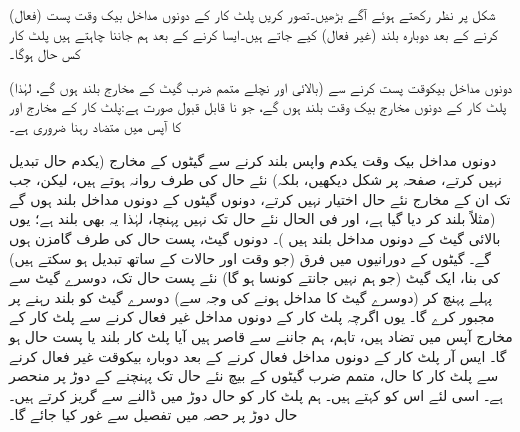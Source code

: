 شکل  پر نظر رکھتے ہوئے  آگے بڑھیں۔تصور کریں  پلٹ کار کے دونوں مداخل بیک وقت     پست (فعال)   کرنے کے بعد دوبارہ  بلند (غیر فعال) کیے جاتے ہیں۔ایسا کرنے کے بعد ہم جاننا چاہتے ہیں  پلٹ کار کس حال  ہوگا۔

دونوں مداخل بیکوقت  پست کرنے سے (بالائی اور نچلے متمم ضرب گیٹ کے  مخارج بلند ہوں گے، لہٰذا)  پلٹ کار کے دونوں مخارج بیک وقت بلند ہوں گے، جو نا قابل قبول  صورت ہے:پلٹ کار  کے مخارج   اور   کا آپس میں  متضاد  رہنا  ضروری ہے۔

  دونوں مداخل  بیک وقت یکدم  واپس  بلند کرنے سے گیٹوں کے مخارج  (یکدم حال تبدیل نہیں کرتے،  صفحہ  پر شکل  دیکھیں، بلکہ)   نئے حال  کی طرف  روانہ ہوتے ہیں، لیکن، جب تک  ان کے مخارج نئے حال اختیار نہیں کرتے، دونوں گیٹوں کے دونوں مداخل بلند ہوں گے (مثلاً    بلند کر دیا گیا ہے، اور فی الحال  نئے حال تک نہیں پہنچا، لہٰذا یہ بھی  بلند ہے؛ یوں بالائی گیٹ کے دونوں مداخل بلند ہیں )۔  دونوں گیٹ، پست حال  کی طرف گامزن ہوں گے۔ گیٹوں کے دورانیوں میں فرق (جو وقت اور حالات کے ساتھ تبدیل ہو سکتے ہیں)  کی بنا، ایک گیٹ (جو  ہم نہیں  جانتے کونسا ہو گا)   نئے پست حال تک، دوسرے گیٹ سے پہلے  پہنچ کر (دوسرے گیٹ کا مداخل ہونے کی وجہ سے)  دوسرے گیٹ کو بلند رہنے پر مجبور کرے گا۔   یوں اگرچہ پلٹ کار کے  دونوں مداخل غیر فعال کرنے سے پلٹ کار کے مخارج آپس میں تضاد ہیں، تاہم، ہم   جاننے سے قاصر ہیں  آیا  پلٹ کار بلند یا پست حال  ہو گا۔ ایس آر پلٹ کار کے دونوں مداخل فعال کرنے کے بعد دوبارہ بیکوقت  غیر فعال کرنے سے  پلٹ کار کا حال،  متمم ضرب گیٹوں کے بیچ نئے حال تک پہنچنے کے  دوڑ پر منحصر ہے۔ اسی لئے اس کو     کہتے ہیں۔ ہم پلٹ کار کو حال دوڑ میں ڈالنے سے گریز کرتے ہیں۔ حال دوڑ پر  حصہ  میں تفصیل سے غور کیا جائے گا۔
  

